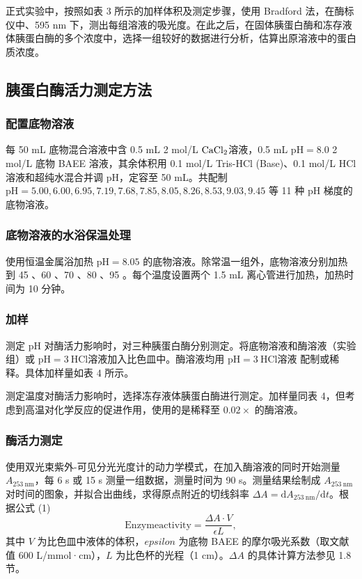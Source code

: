 \documentclass[11pt,UTF8]{ctexart}
\begin{document}
    正式实验中，按照如表 3 所示的加样体积及测定步骤，使用 Bradford 法，在酶标仪中、595 nm 下，测出每组溶液的吸光度。在此之后，在固体胰蛋白酶和冻存液体胰蛋白酶的多个浓度中，选择一组较好的数据进行分析，估算出原溶液中的蛋白质浓度。

    \subsection{胰蛋白酶活力测定方法}
    \subsubsection{配置底物溶液}
    每 50 mL 底物混合溶液中含 0.5 mL 2 mol/L \(\ce{CaCl2}\)溶液，0.5 mL \(\mathrm{pH=8.0}\) 2 mol/L 底物 BAEE 溶液，其余体积用 0.1 mol/L Tris-HCl (Base)、0.1 mol/L HCl 溶液和超纯水混合并调 pH，定容至 50 mL。共配制 \(\mathrm{pH = 5.00, 6.00, 6.95, 7.19, 7.68, 7.85, 8.05, 8.26, 8.53, 9.03, 9.45}\) 等 11 种 pH 梯度的底物溶液。
    \subsubsection{底物溶液的水浴保温处理}
    使用恒温金属浴加热 \(\mathrm{pH=8.05}\) 的底物溶液。除常温一组外，底物溶液分别加热到 45 \textcelsius、60 \textcelsius、70 \textcelsius、80 \textcelsius、95 \textcelsius。每个温度设置两个 1.5 mL 离心管进行加热，加热时间为 10 分钟。
    \subsubsection{加样}
    测定 pH 对酶活力影响时，对三种胰蛋白酶分别测定。将底物溶液和酶溶液（实验组）或 \(\mathrm{pH=3\ HCl}\)溶液加入比色皿中。酶溶液均用 \(\mathrm{pH=3\ HCl}\)溶液 配制或稀释。具体加样量如表 4 所示。

    测定温度对酶活力影响时，选择冻存液体胰蛋白酶进行测定。加样量同表 4，但考虑到高温对化学反应的促进作用，使用的是稀释至 \(0.02 \times\) 的酶溶液。
    \subsubsection{酶活力测定}
    使用双光束紫外-可见分光光度计的动力学模式，在加入酶溶液的同时开始测量 \(A_\mathrm{253\ nm}\)，每 6 s 或 15 s 测量一组数据，测量时间为 90 s。测量结果绘制成 \(A_\mathrm{253\ nm}\) 对时间的图象，并拟合出曲线，求得原点附近的切线斜率 \(\Delta A = \mathrm{d}A_\mathrm{253\ nm}/\mathrm{d}t\)。根据公式 (1)
    \begin{equation}
        \mathrm{Enzyme activity} = \frac{\Delta A\cdot V}{\epsilon L},
    \end{equation}
    其中 \(V\) 为比色皿中液体的体积，\(epsilon\) 为底物 BAEE 的摩尔吸光系数（取文献值 600 L/mmol·cm），\(L\) 为比色杯的光程（1 cm）。\(\Delta A\) 的具体计算方法参见 1.8 节。
\end{document}
